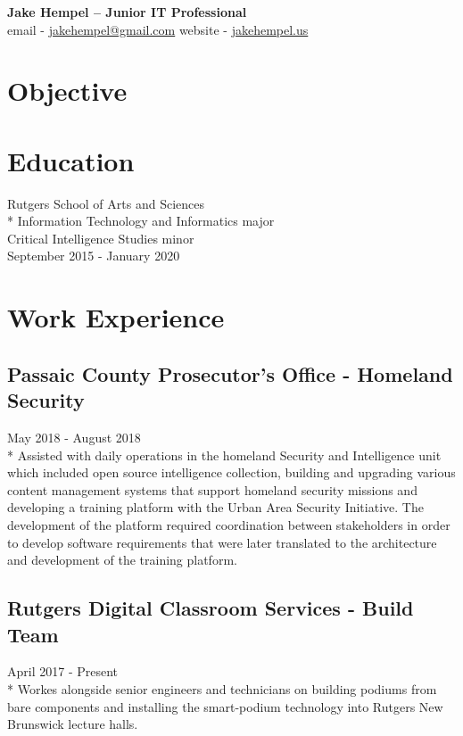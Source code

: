 \documentclass{article}
\begin{document}
\begin{center}
\huge{\textbf{Jake Hempel -- Junior IT Professional}} \\
\large{email - \href{mailto:jakehempel@gmail.com}{jakehempel@gmail.com}
website - \href{jakehempel.us}{jakehempel.us}}
\end{center}

\begin{multicols}{2}

\section{Objective}


\columnbreak

\section{Education}
Rutgers School of Arts and Sciences\\*
Information Technology and Informatics major\\
Critical Intelligence Studies minor\\
September 2015 - January 2020

\end{multicols}

\section{Work Experience}

\subsection{Passaic County Prosecutor's Office - Homeland Security}
May 2018 - August 2018\\*
Assisted with daily operations in the homeland Security and Intelligence unit which included open source intelligence collection, building and upgrading various content management systems that support homeland security missions and developing a training platform with the Urban Area Security Initiative.  The development of the platform required coordination between stakeholders in order to develop software requirements that were later translated to the architecture and development of the training platform.

\subsection{Rutgers Digital Classroom Services - Build Team}
April 2017 - Present\\*
Workes alongside senior engineers and technicians on building podiums from bare components and installing the smart-podium technology into Rutgers New Brunswick lecture halls.
\end{document}
